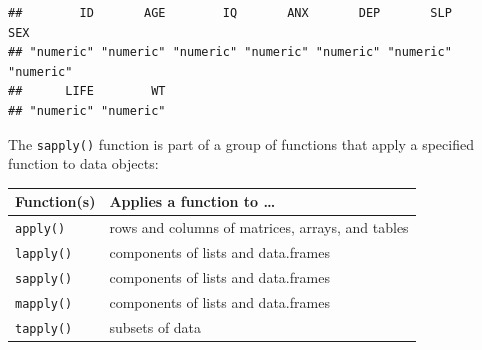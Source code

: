 \documentclass[12pt,]{book}
\theoremstyle{definition}
\theoremstyle{definition}
\theoremstyle{definition}
\theoremstyle{remark}
\begin{document}
\begin{verbatim}
##        ID       AGE        IQ       ANX       DEP       SLP       SEX 
## "numeric" "numeric" "numeric" "numeric" "numeric" "numeric" "numeric" 
##      LIFE        WT 
## "numeric" "numeric"
\end{verbatim}

The \texttt{sapply()} function is part of a group of functions that
apply a specified function to data objects:

\begin{longtable}[]{@{}ll@{}}
\toprule
\begin{minipage}[b]{0.27\columnwidth}\raggedright
\textbf{Function(s)}\strut
\end{minipage} & \begin{minipage}[b]{0.67\columnwidth}\raggedright
\textbf{Applies a function to \ldots{}}\strut
\end{minipage}\tabularnewline
\midrule
\endhead
\begin{minipage}[t]{0.27\columnwidth}\raggedright
\texttt{apply()}\strut
\end{minipage} & \begin{minipage}[t]{0.67\columnwidth}\raggedright
rows and columns of matrices, arrays, and tables\strut
\end{minipage}\tabularnewline
\begin{minipage}[t]{0.27\columnwidth}\raggedright
\texttt{lapply()}\strut
\end{minipage} & \begin{minipage}[t]{0.67\columnwidth}\raggedright
components of lists and data.frames\strut
\end{minipage}\tabularnewline
\begin{minipage}[t]{0.27\columnwidth}\raggedright
\texttt{sapply()}\strut
\end{minipage} & \begin{minipage}[t]{0.67\columnwidth}\raggedright
components of lists and data.frames\strut
\end{minipage}\tabularnewline
\begin{minipage}[t]{0.27\columnwidth}\raggedright
\texttt{mapply()}\strut
\end{minipage} & \begin{minipage}[t]{0.67\columnwidth}\raggedright
components of lists and data.frames\strut
\end{minipage}\tabularnewline
\begin{minipage}[t]{0.27\columnwidth}\raggedright
\texttt{tapply()}\strut
\end{minipage} & \begin{minipage}[t]{0.67\columnwidth}\raggedright
subsets of data\strut
\end{minipage}\tabularnewline
\bottomrule
\end{longtable}
\end{document}

